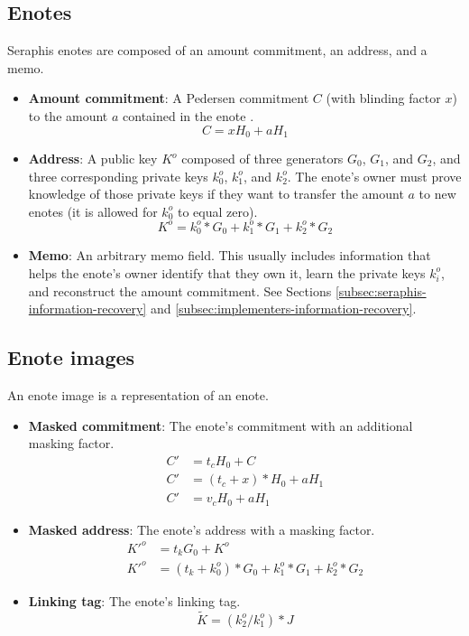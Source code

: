\subsection{Enotes}
\label{subsec:seraphis-enotes}

Seraphis enotes are composed of an amount commitment, an address, and a memo.

\begin{itemize}
    \item \textbf{Amount commitment}: A Pedersen commitment $C$ (with blinding factor $x$) to the amount $a$ contained in the enote \cite{Pedersen1992, maxwell-ct-2}.
    \[C = x H_0 + a H_1\]

    \item \textbf{Address}: A public key $K^o$ composed of three generators $G_0$, $G_1$, and $G_2$, and three corresponding private keys $k^o_0$, $k^o_1$, and $k^o_2$. The enote's owner must prove knowledge of those private keys if they want to transfer the amount $a$ to new enotes (it is allowed for $k^o_0$ to equal zero).\vspace{.115cm}
    \[K^o = k^o_0*G_0 + k^o_1*G_1 + k^o_2*G_2\]

    \item \textbf{Memo}: An arbitrary memo field. This usually includes information that helps the enote's owner identify that they own it, learn the private keys $k^o_i$, and reconstruct the amount commitment. See Sections \ref{subsec:seraphis-information-recovery} and \ref{subsec:implementers-information-recovery}.
\end{itemize}


\subsection{Enote images}
\label{subsec:seraphis-enote-images}

An enote image is a representation of an enote.

\begin{itemize}
    \item \textbf{Masked commitment}: The enote's commitment with an additional masking factor.\vspace{.115cm}
    \begin{align*}
        C' &= t_c H_0 + C \\
        C' &= (t_c + x)*H_0 + a H_1 \\
        C' &= v_c H_0 + a H_1
    \end{align*}

    \item \textbf{Masked address}: The enote's address with a masking factor.\vspace{.115cm}
    \begin{align*}
        K'^o &= t_k G_0 + K^o \\
        K'^o &= (t_k + k^o_0)*G_0 + k^o_1*G_1 + k^o_2*G_2
    \end{align*}

    \item \textbf{Linking tag}: The enote's linking tag.\vspace{.115cm}
    \[\tilde{K} = (k^o_2/k^o_1)*J\]
\end{itemize}

